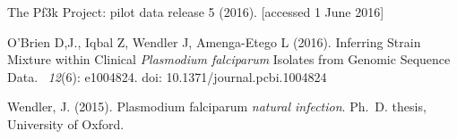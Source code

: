 \documentclass{bioinfo}
\begin{document}
\begin{thebibliography}{}
The Pf3k Project: pilot data release 5 (2016).
 [accessed 1 June 2016]

O'Brien D,J., Iqbal Z, Wendler J, Amenga-Etego L (2016). \newblock Inferring Strain Mixture within Clinical {\em Plasmodium falciparum} Isolates from Genomic Sequence Data. ~{\em 12\/}(6): e1004824. doi: 10.1371/journal.pcbi.1004824


Wendler, J. (2015).
 {P}lasmodium falciparum {\em natural infection}.
\newblock Ph.\ D. thesis, University of Oxford.


\end{thebibliography}
\end{document}

